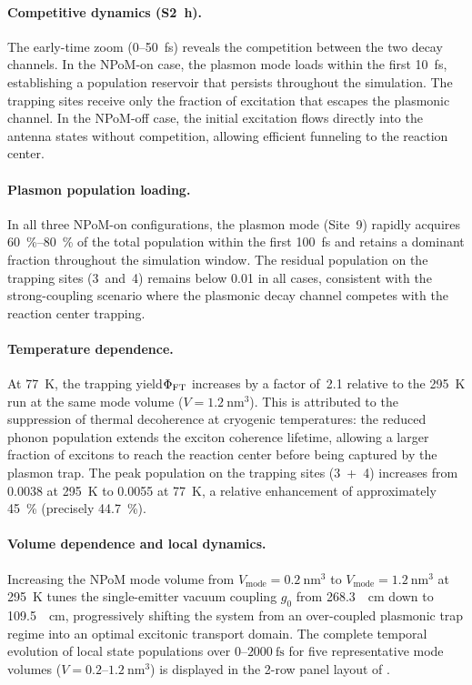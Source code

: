 \documentclass[11pt,a4paper]{article}
\begin{document}
\paragraph{Competitive dynamics (S\qty{2}{\hour}).}
The early-time zoom (0--\qty{50}{\fs}) reveals the competition between the two
decay channels. In the NPoM-on case, the plasmon mode loads within
the first \qty{10}{\fs}, establishing a population reservoir that
persists throughout the simulation. The trapping sites receive only the
fraction of excitation that escapes the plasmonic channel. In the NPoM-off
case, the initial excitation flows directly into the antenna states without
competition, allowing efficient funneling to the reaction center.

\paragraph{Plasmon population loading.}
In all three NPoM-on configurations, the plasmon mode (Site~9) rapidly acquires
\qty{60}{\percent}--\qty{80}{\percent} of the total population within the first
\qty{100}{\fs} and retains a dominant fraction throughout the simulation window.
The residual population on the trapping sites (3~and~4) remains below
\num{0.01} in all cases, consistent with the strong-coupling scenario where
the plasmonic decay channel competes with the reaction center trapping.

\paragraph{Temperature dependence.} \label{SI-sec:cryo}
At \qty{77}{\kelvin}, the trapping yield$\Phi_{\rm FT}$ increases by a factor of~2.1 relative to the \qty{295}{\kelvin} run at the same mode volume
($V = \qty{1.2}{\nm\cubed}$). This is attributed to the suppression of thermal
decoherence at cryogenic temperatures: the reduced phonon population extends
the exciton coherence lifetime, allowing a larger fraction of excitons to reach
the reaction center before being captured by the plasmon trap.
The peak population on the trapping sites (3~+~4) increases from \num{0.0038}
at \qty{295}{\kelvin} to \num{0.0055} at \qty{77}{\kelvin}, a relative enhancement
of approximately \qty{45}{\percent} (precisely \qty{44.7}{\percent}).

\paragraph{Volume dependence and local dynamics.} \label{SI-sec:volume_dependence}
Increasing the NPoM mode volume from $V_{\mathrm{mode}} = \qty{0.2}{\nm\cubed}$ to $V_{\mathrm{mode}} = \qty{1.2}{\nm\cubed}$ at \qty{295}{\kelvin} tunes the single-emitter vacuum coupling $g_0$ from \qty{268.3}{\per\cm} down to \qty{109.5}{\per\cm}, progressively shifting the system from an over-coupled plasmonic trap regime into an optimal excitonic transport domain. The complete temporal evolution of local state populations over $0$--$2000~\mathrm{fs}$ for five representative mode volumes ($V = 0.2$--$1.2~\mathrm{nm}^3$) is displayed in the 2-row panel layout of .
\end{document}
